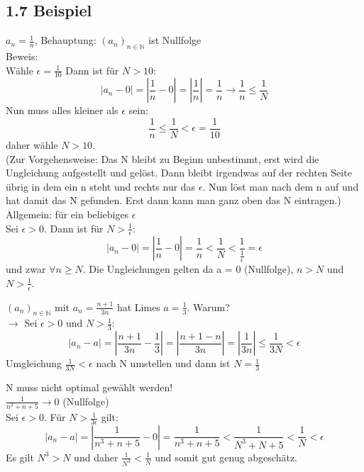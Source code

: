 \documentclass[12pt]{article}
\begin{document}
\subsection*{1.7 Beispiel}
\begin{compactenum}[\bfseries a)]
	\item $a_n = \frac{1}{n}$, Behauptung: $(a_n)_{n\in\mathbb{N}}$ ist Nullfolge\\
	Beweis:\\
	Wähle $\epsilon = \frac{1}{10}$ Dann ist für $N>10$: 
	$$ |a_n - 0| = |\frac{1}{n} - 0| = |\frac{1}{n}| = \frac{1}{n} \rightarrow \frac{1}{n} \leq \frac{1}{N}$$
	Nun muss alles kleiner als $\epsilon$ sein: \\
	$$ \frac{1}{n} \leq \frac{1}{N} < \epsilon = \frac{1}{10}$$
	daher wähle $N>10$.\\
	(Zur Vorgehensweise: Das N bleibt zu Beginn unbestimmt, erst wird die Ungleichung aufgestellt und gelöst. Dann bleibt irgendwas auf der rechten Seite übrig in dem ein n steht und rechts nur das $\epsilon$. Nun löst man nach dem n auf und hat damit das N gefunden. Erst dann kann man ganz oben das N eintragen.)\\
	
	Allgemein: für ein beliebiges $\epsilon$\\
	Sei $\epsilon >0 $. Dann ist für $N > \frac{1}{\epsilon}$:
	$$ |a_n - 0| = |\frac{1}{n} - 0| = \frac{1}{n} < \frac{1}{N} < \frac{1}{\frac{1}{\epsilon}} = \epsilon$$ 
	und zwar $\forall n \geq N$. Die Ungleichungen gelten da a = 0 (Nullfolge), $n>N$ und $N > \frac{1}{\epsilon}$.\\
	
	\item $(a_n)_{n\in\mathbb{N}}$ mit $ a_n = \frac{n+1}{3n}$ hat Limes $a= \frac{1}{3}$. Warum? \\
	$\rightarrow$ Sei $\epsilon > 0 $ und $N > \frac{1}{3}$:
	$$ |a_n - a| = | \frac{n+1}{3n} - \frac{1}{3}| = | \frac{n+1-n}{3n}| = | \frac{1}{3n}| \leq \frac{1}{3N} < \epsilon$$
	Umgleichung $\frac{1}{3N} < \epsilon$ nach N umstellen und dann ist $N =\frac{1}{3}$\\
	
	\item N muss nicht optimal gewählt werden!\\
	$\frac{1}{n^3 + n + 5} \rightarrow 0 $ (Nullfolge)\\
	Sei $\epsilon > 0$. Für $N > \frac{1}{3\epsilon}$ gilt:
	$$|a_n -a| = |\frac{1}{n^3 + n + 5} - 0| = \frac{1}{n^3 + n + 5} < \frac{1}{N^3 + N + 5} < \frac{1}{N} < \epsilon$$ 
	Es gilt $N^3 > N$ und daher $\frac{1}{N^3}< \frac{1}{N}$ und somit gut genug abgeschätz. \\
\end{compactenum}
\end{document}
